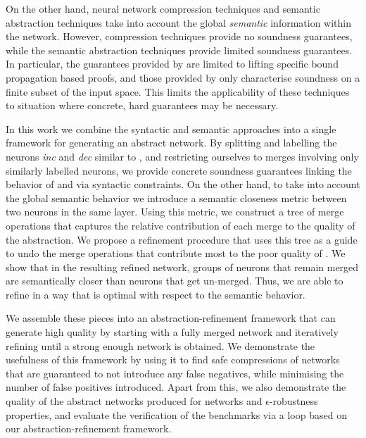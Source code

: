 On the other hand, neural network compression techniques \cite{dnn-compression}
and semantic abstraction techniques \cite{deep-abstract, lin-comb-abs-jan} take
into account the global \textit{semantic} information within the network.
However,
compression techniques provide no soundness guarantees, while the semantic
abstraction techniques provide limited soundness guarantees. In particular, the
guarantees provided by \cite{deep-abstract} are limited to lifting specific
bound propagation based proofs, and those provided by \cite{lin-comb-abs-jan}
only characterise soundness on a finite subset of the input space. This limits
the applicability of these techniques to situation where concrete, hard
guarantees may be necessary.

In this work we combine the syntactic and semantic approaches into a single
framework for generating an abstract network. By splitting and labelling the
neurons \textit{inc} and \textit{dec} similar to \cite{cegar-nn}, and
restricting ourselves to merges involving only similarly labelled neurons, we
provide concrete soundness guarantees linking the behavior of \cnc and \abs via
syntactic constraints.
On the other hand, to take into account the global semantic behavior we
introduce a semantic closeness metric between two neurons in the same layer.
Using this metric, we construct a tree of merge operations that 
captures the relative contribution of each merge to the quality of the
abstraction. We propose a refinement procedure that uses this
tree as a guide to undo the merge operations that
contribute most to the poor quality of \abs.  We show that in the resulting
refined network, groups of neurons that remain merged are semantically closer
than neurons that get un-merged. Thus, we are able to refine \abs in a way that
is optimal with respect to the semantic behavior.

We assemble these pieces into an abstraction-refinement framework that can
generate high quality \abs by starting with a fully merged network and
iteratively refining until a strong enough network is obtained. We demonstrate
the usefulness of this framework by using it to find safe compressions of \mnist
networks that are guaranteed to not introduce any false negatives, while
minimising the number of false positives introduced. Apart from this, we also
demonstrate the quality of the abstract networks produced for \mnist networks
and $\epsilon$-robustness properties, and evaluate the verification of the
\acasxu benchmarks via a \cegar loop based on our abstraction-refinement
framework.
